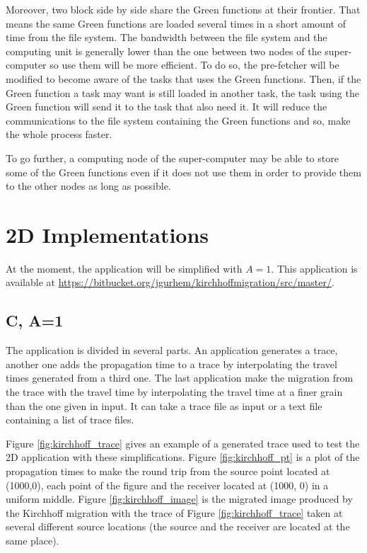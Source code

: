 Moreover, two block side by side share the Green functions at their frontier.
That means the same Green functions are loaded several times in a short amount of time from the file system.
The bandwidth between the file system and the computing unit is generally lower than the one between two nodes of the super-computer so use them will be more efficient.
To do so, the pre-fetcher will be modified to become aware of the tasks that uses the Green functions.
Then, if the Green function a task may want is still loaded in another task, the task using the Green function will send it to the task that also need it.
It will reduce the communications to the file system containing the Green functions and so, make the whole process faster.

To go further, a computing node of the super-computer may be able to store some of the Green functions even if it does not use them in order to provide them to the other nodes as long as possible.

\section{2D Implementations}

At the moment, the application will be simplified with $A=1$.
This application is available at \url{https://bitbucket.org/jgurhem/kirchhoffmigration/src/master/}.

\subsection{C, A=1}

The application is divided in several parts.
An application generates a trace, another one adds the propagation time to a trace by interpolating the travel times generated from a third one.
The last application make the migration from the trace with the travel time by interpolating the travel time at a finer grain than the one given in input.
It can take a trace file as input or a text file containing a list of trace files.

Figure \ref{fig:kirchhoff_trace} gives an example of a generated trace used to test the 2D application with these simplifications.
Figure \ref{fig:kirchhoff_pt} is a plot of the propagation times to make the round trip from the source point located at (1000,0), each point of the figure and the receiver located at (1000, 0) in a uniform middle.
Figure \ref{fig:kirchhoff_image} is the migrated image produced by the Kirchhoff migration with the trace of Figure \ref{fig:kirchhoff_trace} taken at several different source locations (the source and the receiver are located at the same place).


